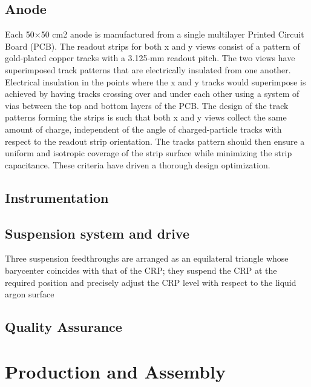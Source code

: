 \subsection{Anode}
\label{sec:fddp-crp-anode}
Each 50×50 cm2 anode is manufactured from a single multilayer Printed Circuit Board (PCB). The readout strips for both x and y views consist of a pattern of gold-plated
copper tracks with a 3.125-mm readout pitch. The two views have superimposed track patterns
that are electrically insulated from one another. Electrical insulation in the points where the x and y tracks would superimpose is achieved by having tracks crossing over and under each other using a system of vias between the top and bottom layers of the PCB.
The design of the track patterns forming the strips is such that both x and y views collect the same amount of charge, independent of the angle of charged-particle tracks with respect to the readout strip orientation. The tracks pattern should then ensure a uniform and isotropic coverage of the strip surface while minimizing the strip capacitance. These criteria have driven a thorough design optimization. 

\subsection{Instrumentation}
\label{sec:fddp-crp-instr}

\subsection{Suspension system and drive}
\label{sec:fddp-crp-suspension}
Three suspension feedthroughs are arranged as an equilateral triangle whose barycenter coincides with that of the CRP; they suspend the CRP at the required position and precisely adjust the CRP level with respect to the liquid argon surface


\subsection{Quality Assurance}
\label{sec:fddp-crp-qa}




\section{Production and Assembly}
\label{sec:fddp-crp-prod-assy}

